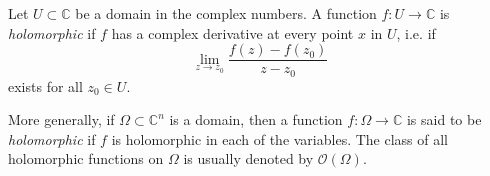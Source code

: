 \documentclass[12pt]{article}
\begin{document}
Let $U \subset \mathbb{C}$ be a domain in the complex numbers. A
function $f \colon U \longrightarrow \mathbb{C}$ is \emph{holomorphic} if $f$
has a complex derivative at every point $x$ in $U$, i.e. if 
$$\lim_{z\rightarrow z_0} \frac{f(z)-f(z_0)}{z-z_0}$$
exists for all $z_0\in U$.

More generally, if $\Omega\subset \mathbb{C}^n$ is a domain, then a function $f\colon \Omega \to \mathbb{C}$ is said to be \emph{holomorphic} if $f$ is holomorphic in each of the variables. The class of all holomorphic functions on $\Omega$ is usually denoted by $\mathcal{O}(\Omega)$.
\end{document}
